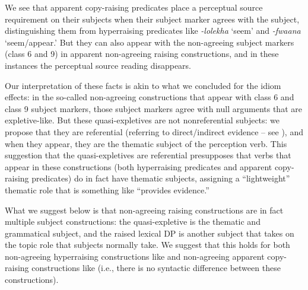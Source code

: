 \documentclass[output=paper,colorlinks,citecolor=brown
]{langscibook}
\begin{document}



We see that apparent copy-raising predicates place a perceptual source requirement on their subjects when their subject marker agrees with the subject, distinguishing them from hyperraising predicates like \textit{-lolekha} `seem' and \textit{-fwaana} `seem/appear.' But they can also appear with the non-agreeing subject markers (class 6 and 9) in apparent non-agreeing raising constructions, and in these instances the perceptual source reading disappears. 

Our interpretation of these facts is akin to what we concluded for the idiom effects: in the so-called non-agreeing constructions that appear with class 6 and class 9 subject markers, those subject markers agree with null arguments that are expletive-like. But these quasi-expletives are not nonreferential subjects: we propose that they are referential (referring to direct/indirect evidence -- see ), and when they appear, they are the thematic subject of the perception verb. This suggestion that the quasi-expletives are referential presupposes that verbs that appear in these constructions (both hyperraising predicates and apparent copy-raising predicates) do in fact have thematic subjects, assigning a ``lightweight'' thematic role that is something like ``provides evidence.'' 

What we suggest below is that non-agreeing raising constructions are in fact multiple subject constructions: the quasi-expletive is the thematic and grammatical subject, and the raised lexical DP is another subject that takes on the topic role that subjects normally take. We suggest that this holds for both non-agreeing hyperraising constructions like  and non-agreeing apparent copy-raising constructions like  (i.e., there is no syntactic difference between these constructions).
\end{document}
